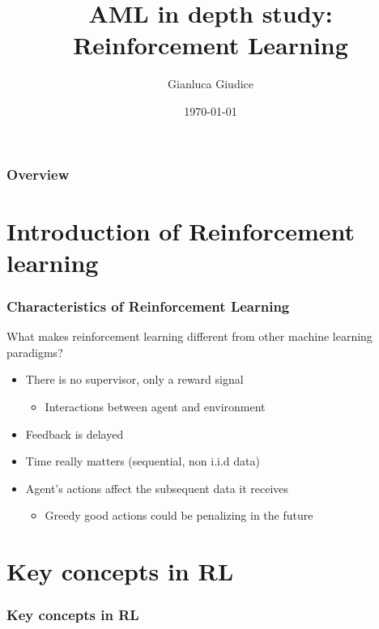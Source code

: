 \documentclass[9pt]{beamer}
\title{AML in depth study: Reinforcement Learning}
\author{
 Gianluca Giudice
}
\institute[UNIMIB] %
{
University of Milano-Bicocca\\
\medskip
\textit{g.giudice2@campus.unimib.it}
}
\date{\today} %
\begin{document}
\begin{frame}
\titlepage %
\end{frame}

\begin{frame}
\frametitle{Overview} %
\tableofcontents %
\end{frame}

\section{Introduction of Reinforcement learning}

\begin{frame}
\frametitle{Characteristics of Reinforcement Learning}

What makes reinforcement learning different from other machine learning paradigms?
\begin{itemize}
\item There is no supervisor, only a reward signal
\begin{itemize}
	\item Interactions between agent and environment
\end{itemize}
\item Feedback is delayed
\item Time really matters (sequential, non i.i.d data)
\item Agent's actions affect the subsequent data it receives
\begin{itemize}
	\item Greedy good actions could be penalizing in the future
\end{itemize}
\end{itemize}

\end{frame}

\section{Key concepts in RL}

\begin{frame}
\frametitle{Key concepts in RL}

\tableofcontents[ 
currentsubsection, 
hideothersubsections, 
sectionstyle=show/shaded,
]

\end{frame}
\end{document}

